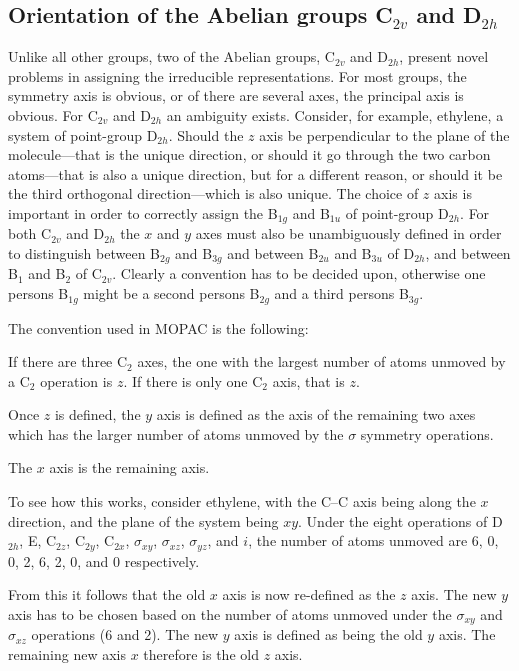 \subsection{Orientation of the Abelian groups C$_{2v}$ and D$_{2h}$}
Unlike all other groups, two of the Abelian groups, C$_{2v}$ and  D$_{2h}$,
present novel problems in assigning the irreducible representations.  For most
groups, the symmetry axis is obvious, or of there are several axes, the
principal axis is obvious.  For C$_{2v}$ and D$_{2h}$ an ambiguity exists. 
Consider, for example, ethylene, a system of point-group D$_{2h}$.  Should the
$z$ axis be perpendicular to the plane of the molecule---that is the unique
direction, or should it go through the two carbon atoms---that is also a unique
direction, but for a different reason, or should it be the third orthogonal
direction---which is also unique.  The choice of $z$ axis is important in order
to correctly assign the B$_{1g}$ and B$_{1u}$ of point-group D$_{2h}$.  For
both C$_{2v}$ and D$_{2h}$ the $x$ and $y$ axes must also be unambiguously
defined in order to distinguish  between B$_{2g}$ and B$_{3g}$ and between
B$_{2u}$ and B$_{3u}$ of  D$_{2h}$, and between B$_{1}$ and B$_{2}$ of
C$_{2v}$. Clearly a convention has to be decided upon, otherwise one persons
B$_{1g}$ might be a second persons B$_{2g}$ and a third persons B$_{3g}$.

The convention used in MOPAC is the following:

If there are three C$_2$ axes, the one with the largest number of atoms unmoved
by a C$_2$ operation is $z$.  If there is only one C$_2$ axis, that is $z$.

Once $z$ is defined, the $y$ axis is defined as the axis of the remaining two
axes which has the larger number of atoms unmoved by  the $\sigma$ symmetry
operations.  

The $x$ axis is the remaining axis.

To see how this works, consider ethylene, with the C--C axis being along the
$x$ direction, and the plane of the system being $xy$. Under the eight
operations of D$_{2h}$, E, C$_{2z}$, C$_{2y}$, C$_{2x}$, $\sigma_{xy}$,
$\sigma_{xz}$, $\sigma _{yz}$, and $i$, the number of atoms unmoved are 6, 0,
0, 2, 6, 2, 0, and 0 respectively.

From this it follows that the old $x$ axis is now re-defined as the $z$ axis. 
The new $y$ axis has to be chosen based on the number of atoms unmoved under
the $\sigma_{xy}$ and $\sigma_{xz}$ operations (6 and 2). The new $y$ axis is
defined as being the old $y$ axis.  The remaining new axis $x$ therefore is the
old $z$ axis.

